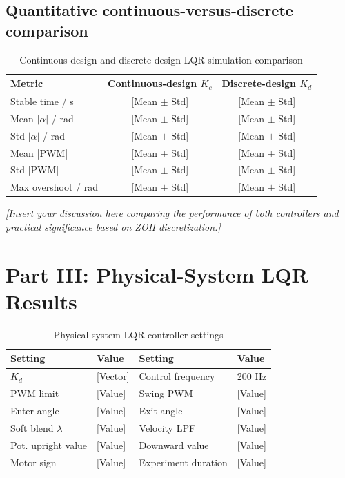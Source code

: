 \documentclass[12pt,a4paper]{article}
\begin{document}
\subsection{Quantitative continuous-versus-discrete comparison}

\begin{table}[h!]
    \centering
    \caption{Continuous-design and discrete-design LQR simulation comparison}
    \begin{tabular}{lcc}
        \toprule
        \textbf{Metric} & \textbf{Continuous-design $K_c$} & \textbf{Discrete-design $K_d$} \\
        \midrule
        Stable time / s & [Mean $\pm$ Std] & [Mean $\pm$ Std] \\
        Mean $|\alpha|$ / rad & [Mean $\pm$ Std] & [Mean $\pm$ Std] \\
        Std $|\alpha|$ / rad & [Mean $\pm$ Std] & [Mean $\pm$ Std] \\
        Mean |PWM| & [Mean $\pm$ Std] & [Mean $\pm$ Std] \\
        Std |PWM| & [Mean $\pm$ Std] & [Mean $\pm$ Std] \\
        Max overshoot / rad & [Mean $\pm$ Std] & [Mean $\pm$ Std] \\
        \bottomrule
    \end{tabular}
\end{table}

\textit{[Insert your discussion here comparing the performance of both controllers and practical significance based on ZOH discretization.]}

\section{Part III: Physical-System LQR Results}

\begin{table}[h!]
    \centering
    \caption{Physical-system LQR controller settings}
    \begin{tabular}{ll|ll}
        \toprule
        \textbf{Setting} & \textbf{Value} & \textbf{Setting} & \textbf{Value} \\
        \midrule
        $K_d$ & [Vector] & Control frequency & 200 Hz \\
        PWM limit & [Value] & Swing PWM & [Value] \\
        Enter angle & [Value] & Exit angle & [Value] \\
        Soft blend $\lambda$ & [Value] & Velocity LPF & [Value] \\
        Pot. upright value & [Value] & Downward value & [Value] \\
        Motor sign & [Value] & Experiment duration & [Value] \\
        \bottomrule
    \end{tabular}
\end{table}
\end{document}
